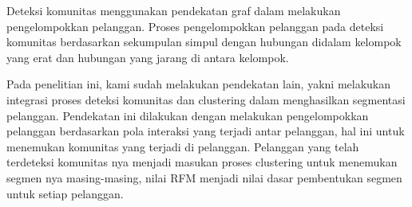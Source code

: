 \documentclass[conference]{IEEEtran}
\begin{document}
Deteksi komunitas menggunakan pendekatan graf dalam melakukan pengelompokkan pelanggan. Proses pengelompokkan pelanggan pada deteksi komunitas berdasarkan sekumpulan simpul dengan hubungan didalam kelompok yang erat dan hubungan yang jarang di antara kelompok.

Pada penelitian ini, kami sudah melakukan pendekatan lain, yakni melakukan integrasi proses deteksi komunitas dan clustering dalam menghasilkan segmentasi pelanggan. Pendekatan ini dilakukan dengan melakukan pengelompokkan pelanggan berdasarkan pola interaksi yang terjadi antar pelanggan, hal ini untuk menemukan komunitas yang terjadi di pelanggan. Pelanggan yang telah terdeteksi komunitas nya menjadi masukan proses clustering untuk menemukan segmen nya masing-masing, nilai RFM menjadi nilai dasar pembentukan segmen untuk setiap pelanggan.

%
%



%
%
\end{document}
